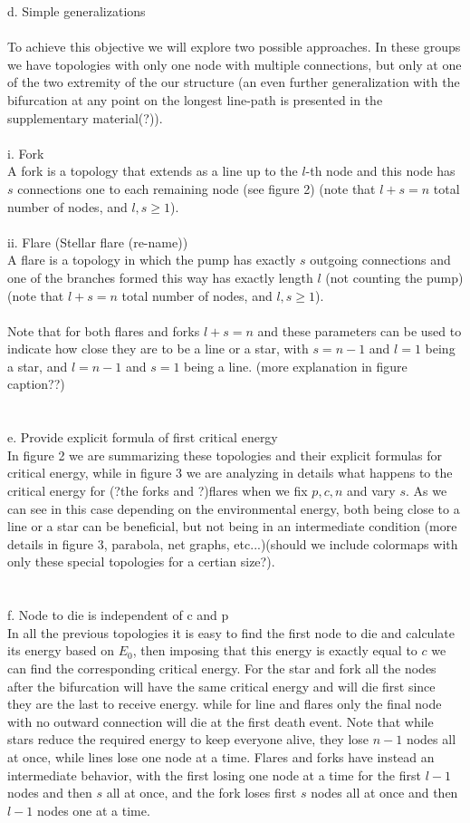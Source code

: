 \documentclass{amsart}
\theoremstyle{plain}
\numberwithin{equation}{section}
\begin{document}
 d. Simple generalizations\\
\\To achieve this objective we will explore two possible approaches. In these groups we have topologies with only one node with multiple connections, but only at one of the two extremity of the our structure (an even further generalization with the bifurcation at any point on the longest line-path is presented in the supplementary material(?)).
\\
\\
  i. Fork\\
  A fork is a topology that extends as a line up to the $l$-th node and this node has $s$ connections one to each remaining node (see figure 2) (note that $l+s=n$ total number of nodes, and $l,s\geq 1$).
	\\
	\\
	ii. Flare (Stellar flare (re-name))\\
	A flare is a topology in which the pump has exactly $s$ outgoing connections and one of the branches formed this way has exactly length $l$ (not counting the pump) (note that $l+s=n$ total number of nodes, and $l,s\geq 1$).\\
	\\
	Note that for both flares and forks $l+s=n$ and these parameters can be used to indicate how close they are to be a line or a star, with $s=n-1$ and $l=1$ being a star, and $l=n-1$ and $s=1$ being a line.
	(more explanation in figure caption??) 
	\\
	\\
	\\
 e. Provide explicit formula of first critical energy\\
 In figure 2 we are summarizing these topologies and their explicit formulas for critical energy, while in figure 3 we are analyzing in details what happens to the critical energy for (?the forks and ?)flares when we fix $p,c,n$ and vary $s$. As we can see in this case depending on the environmental energy, both being close to a line or a star can be beneficial, but not being in an intermediate condition (more details in figure 3, parabola, net graphs, etc...)(should we include colormaps with only these special topologies for a certian size?).
\\
\\
\\
 f. Node to die is independent of c and p\\
 In all the previous topologies it is easy to find the first node to die and calculate its energy based on $E_0$, then imposing that this energy is exactly equal to $c$ we can find the corresponding critical energy. For the star and fork all the nodes after the bifurcation will have the same critical energy and will die first since they are the last to receive energy. while for line and flares only the final node with no outward connection will die at the first death event. Note that while stars reduce the required energy to keep everyone alive, they lose $n-1$ nodes all at once, while lines lose one node at a time. Flares and forks have instead an intermediate behavior, with the first losing one node at a time for the first $l-1$ nodes and then $s$ all at once, and the fork loses first $s$ nodes all at once and then $l-1$ nodes one at a time.
\end{document}
